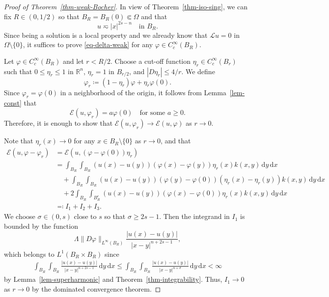 \documentclass[11pt]{amsart}
\theoremstyle{plain}
\theoremstyle{definition}
\numberwithin{equation}{section}
\begin{document}
\begin{proof}[Proof of Theorem~\ref{thm-weak-Bocher}]
In view of Theorem~\ref{thm-iso-sing}, we can fix $R \in (0,1/2)$ so that $B_R = B_R(0) \Subset \Omega$ and that
	\begin{equation}\label{eq-asymp}
		u \eqsim |x|^{2s-n}
		\quad \text{in }B_R.
	\end{equation}
	Since being a solution is a local property and we already know that $\mathcal{L}u=0$ in $\Omega \setminus \{0\}$, it suffices to prove \eqref{eq-delta-weak} for any $\varphi \in C_c^{\infty}(B_R)$.
	
	Let $\varphi \in C_c^{\infty}(B_R)$ and let $r<R/2$. Choose a cut-off function $\eta_r \in C_c^{\infty}(B_r)$ such that $0\leq \eta_r \leq 1$ in $\mathbb{R}^n$, $\eta_r=1$ in $B_{r/2}$, and $|D\eta_r| \leq 4/r$. We define
	\begin{equation*}
		\varphi_r \coloneqq (1-\eta_r)\varphi+\eta_r \varphi(0).
	\end{equation*}
	Since $\varphi_r=\varphi(0)$ in a neighborhood of the origin, it follows from Lemma~\ref{lem-const} that
	\begin{equation*}
		\mathcal{E}(u, \varphi_r)=a \varphi(0) \quad \text{for some $a \geq 0$}.
	\end{equation*}
     Therefore, it is enough to show that $\mathcal{E}(u, \varphi_r) \to \mathcal{E}(u, \varphi)$ as $r \to 0$.
    
	Note that $\eta_r(x) \to 0$ for any $x \in B_R \setminus \{0\}$ as $r \to 0$, and that
	\begin{align*}
		\mathcal{E}(u, \varphi-\varphi_r)
        &=\mathcal{E}(u, (\varphi-\varphi(0))\eta_r)\\
		&=\int_{B_R} \int_{B_R} (u(x)-u(y))(\varphi(x)-\varphi(y))\eta_r(x) k(x, y) \,\mathrm{d}y\,\mathrm{d}x\\
		&\quad+\int_{B_R} \int_{B_R} (u(x)-u(y))(\varphi(y)-\varphi(0))(\eta_r(x)-\eta_r(y))k(x, y) \,\mathrm{d}y\,\mathrm{d}x\\
		&\quad+2\int_{B_R} \int_{B_R^c} (u(x)-u(y))(\varphi(x)-\varphi(0))\eta_r(x)k(x, y) \,\mathrm{d}y\,\mathrm{d}x \\
		&\eqqcolon I_1+I_2+I_3.
	\end{align*}
We choose $\sigma \in (0,s)$ close to $s$ so that $\sigma \geq 2s-1$. Then the integrand in $I_1$ is bounded by the function
\begin{equation*}
    \Lambda \|D\varphi\|_{L^\infty(B_R)} \frac{|u(x)-u(y)|}{|x-y|^{n+2s-1}},
\end{equation*}
which belongs to $L^1(B_R \times B_R)$ since
\begin{align*}
    \int_{B_R} \int_{B_R} \frac{|u(x)-u(y)|}{|x-y|^{n+2s-1}} \,\mathrm{d}y \,\mathrm{d}x \leq \int_{B_R} \int_{B_R} \frac{|u(x)-u(y)|}{|x-y|^{n+\sigma}} \,\mathrm{d}y \,\mathrm{d}x < \infty
\end{align*}
by Lemma~\ref{lem-superharmonic} and Theorem~\ref{thm-integrability}. Thus, $I_1 \to 0$ as $r \to 0$ by the dominated convergence theorem.


\end{proof}
\end{document}
